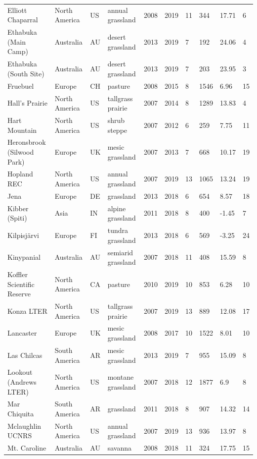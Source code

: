 \documentclass[twoside,12pt,final]{ucthesis-CA2012}
\begin{document}
\begin{ucmainmatter}
\begin{table}[ht]
{\begin{tabular}{llllllllll}
  Elliott Chaparral & North America & US & annual grassland & 2008 & 2019 & 11 & 344 & 17.71 & 6 \\ 
  Ethabuka (Main Camp) & Australia & AU & desert grassland & 2013 & 2019 & 7 & 192 & 24.06 & 4 \\ 
  Ethabuka (South Site) & Australia & AU & desert grassland & 2013 & 2019 & 7 & 203 & 23.95 & 3 \\ 
  Fruebuel & Europe & CH & pasture & 2008 & 2015 & 8 & 1546 & 6.96 & 15 \\ 
  Hall's Prairie & North America & US & tallgrass prairie & 2007 & 2014 & 8 & 1289 & 13.83 & 4 \\ 
  Hart Mountain & North America & US & shrub steppe & 2007 & 2012 & 6 & 259 & 7.75 & 11 \\ 
  Heronsbrook (Silwood Park) & Europe & UK & mesic grassland & 2007 & 2013 & 7 & 668 & 10.17 & 19 \\ 
  Hopland REC & North America & US & annual grassland & 2007 & 2019 & 13 & 1065 & 13.24 & 19 \\ 
  Jena & Europe & DE & grassland & 2013 & 2018 & 6 & 654 & 8.57 & 18 \\ 
  Kibber (Spiti) & Asia & IN & alpine grassland & 2011 & 2018 & 8 & 400 & -1.45 & 7 \\ 
  Kilpisjärvi & Europe & FI & tundra grassland & 2013 & 2018 & 6 & 569 & -3.25 & 24 \\ 
  Kinypanial & Australia & AU & semiarid grassland & 2007 & 2018 & 11 & 408 & 15.59 & 8 \\ 
  Koffler Scientific Reserve & North America & CA & pasture & 2010 & 2019 & 10 & 853 & 6.28 & 10 \\ 
  Konza LTER & North America & US & tallgrass prairie & 2007 & 2019 & 13 & 889 & 12.08 & 17 \\ 
  Lancaster & Europe & UK & mesic grassland & 2008 & 2017 & 10 & 1522 & 8.01 & 10 \\ 
  Las Chilcas & South America & AR & mesic grassland & 2013 & 2019 & 7 & 955 & 15.09 & 8 \\ 
  Lookout (Andrews LTER) & North America & US & montane grassland & 2007 & 2018 & 12 & 1877 & 6.9 & 8 \\ 
  Mar Chiquita & South America & AR & grassland & 2011 & 2018 & 8 & 907 & 14.32 & 14 \\ 
  Mclaughlin UCNRS & North America & US & annual grassland & 2007 & 2019 & 13 & 936 & 13.97 & 8 \\ 
  Mt. Caroline & Australia & AU & savanna & 2008 & 2018 & 11 & 324 & 17.75 & 15 \\ 

\end{tabular}}
\end{table}
\end{ucmainmatter}
\end{document}

